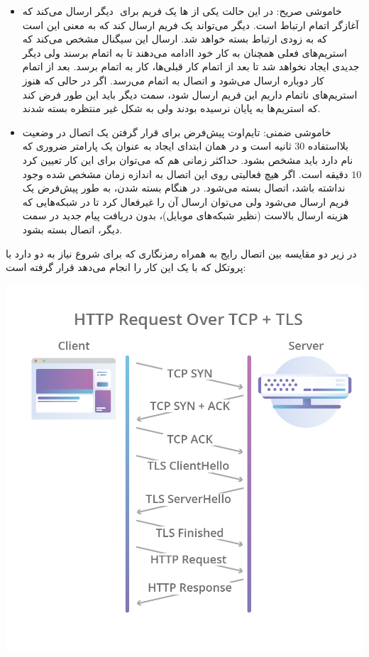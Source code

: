 \documentclass[12pt]{article}
\begin{document}
\begin{enumerate}
\begin{itemize}
	\item 
	خاموشی صریح: در این حالت یکی از  ها یک فریم  برای ‌ دیگر ارسال می‌کند که آغازگر اتمام ارتباط است. ‌دیگر می‌تواند یک فریم ‌ارسال کند که به معنی این است که به زودی ارتباط بسته خواهد شد. ارسال این سیگنال مشخص می‌کند که استریم‌های فعلی همچنان به کار خود اادامه می‌دهند تا به اتمام برسند ولی دیگر  جدیدی ایجاد نخواهد شد تا بعد از اتمام کار قبلی‌ها، کار به اتمام برسد. بعد از اتمام کار دوباره  ارسال می‌شود و اتصال به اتمام می‌رسد. اگر در حالی که هنوز استریم‌های ناتمام داریم این فریم ارسال شود، سمت دیگر باید این طور فرض کند که استریم‌ها به پایان نرسیده بودند ولی به شکل غیر منتظره بسته شدند.
	
	\item
	خاموشی ضمنی: تایم‌اوت پیش‌فرض برای قرار گرفتن یک اتصال در وضعیت بلااستفاده $30$ ثانیه است و در همان ابتدای ایجاد به عنوان یک پارامتر ضروری که  نام دارد باید مشخص بشود. حداکثر زمانی هم که می‌توان برای این کار تعیین کرد $10$ دقیقه است. اگر هیچ فعالیتی روی این اتصال به اندازه زمان مشخص شده وجود نداشته باشد، اتصال بسته می‌شود. در هنگام بسته شدن، به طور پیش‌فرض یک فریم  ارسال می‌شود ولی می‌توان ارسال آن را غیرفعال کرد تا در شبکه‌هایی که هزینه ارسال بالاست (نظیر شبکه‌های موبایل)، بدون دریافت پیام جدید در سمت دیگر، اتصال بسته بشود.
	
	
\end{itemize}

در زیر دو مقایسه بین اتصال  رایج به همراه رمزنگاری  که برای شروع نیاز به دو  دارد با پروتکل  که با یک  این کار را انجام می‌دهد قرار گرفته است:


\begin{center}
	\includegraphics[width = 0.55 \textwidth]{images/11.png}
\end{center}



\end{enumerate}
\end{document}
